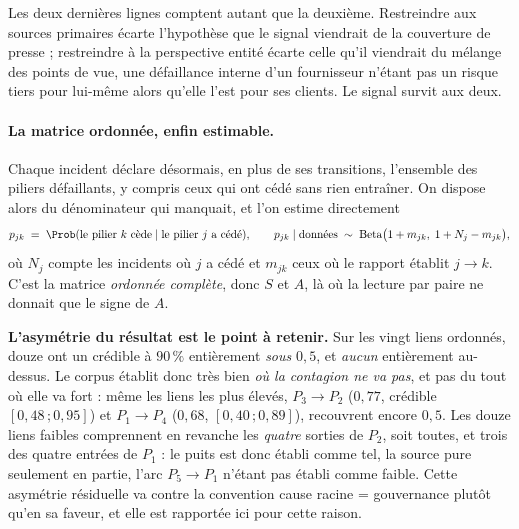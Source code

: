 \vspace{2pt}
Les deux dernières lignes comptent autant que la deuxième. Restreindre aux sources
primaires écarte l'hypothèse que le signal viendrait de la couverture de presse ; restreindre à
la perspective entité écarte celle qu'il viendrait du mélange des points de vue, une
défaillance interne d'un fournisseur n'étant pas un risque tiers pour lui-même alors qu'elle
l'est pour ses clients. Le signal survit aux deux.

\paragraph{La matrice ordonnée, enfin estimable.} Chaque incident déclare désormais, en plus de
ses transitions, l'ensemble des piliers défaillants, y compris ceux qui ont cédé sans
rien entraîner. On dispose alors du dénominateur qui manquait, et l'on estime directement
\begin{equation}
  p_{jk} \;=\; \Prob(\text{le pilier } k \text{ cède} \mid \text{le pilier } j \text{ a cédé}),
  \qquad
  p_{jk}\mid\text{données} \;\sim\; \mathrm{Beta}\bigl(1+m_{jk},\;1+N_j-m_{jk}\bigr),
\end{equation}
où $N_j$ compte les incidents où $j$ a cédé et $m_{jk}$ ceux où le rapport établit $j\to k$.
C'est la matrice \emph{ordonnée complète}, donc $S$ et $A$, là où la lecture par paire
ne donnait que le signe de $A$.

\begin{attention}
\textbf{L'asymétrie du résultat est le point à retenir.} Sur les vingt liens
ordonnés, douze ont un crédible à $90\,\%$ entièrement \emph{sous} $0{,}5$, et
\emph{aucun} entièrement au-dessus. Le corpus établit donc très bien \emph{où la contagion ne
va pas}, et pas du tout où elle va fort : même les liens les plus élevés, $P_3\to P_2$
($0{,}77$, crédible $[0{,}48\,;0{,}95]$) et $P_1\to P_4$ ($0{,}68$, $[0{,}40\,;0{,}89]$),
recouvrent encore $0{,}5$. Les douze liens faibles comprennent en revanche les
\emph{quatre} sorties de $P_2$, soit toutes, et trois des quatre entrées de $P_1$ : le puits est
donc établi comme tel, la source pure seulement en partie, l'arc $P_5 \to P_1$ n'étant pas établi
comme faible. Cette asymétrie résiduelle va contre la convention \og{}cause racine =
gouvernance\fg{} plutôt qu'en sa faveur, et elle est rapportée ici pour cette raison.
\end{attention}

